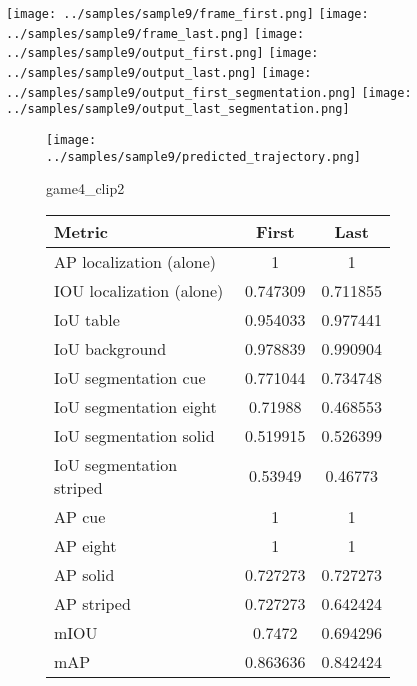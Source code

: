 \begin{figure}
    \texttt{[image: ../samples/sample9/frame\_first.png]}
    \texttt{[image: ../samples/sample9/frame\_last.png]}
    \newline
    \texttt{[image: ../samples/sample9/output\_first.png]}
    \texttt{[image: ../samples/sample9/output\_last.png]}
    \newline
    \texttt{[image: ../samples/sample9/output\_first\_segmentation.png]}
    \texttt{[image: ../samples/sample9/output\_last\_segmentation.png]}
    \newline
    \begin{subfigure}[b]{0.49\textwidth}
        \vspace{20pt}
        \texttt{[image: ../samples/sample9/predicted\_trajectory.png]}
        \caption*{game4\_clip2}
    \end{subfigure}
\begin{subfigure}[b]{0.49\textwidth}
    \begin{tabular}{|l|c|c|}
        \hline
        \textbf{Metric} & \textbf{First} & \textbf{Last} \\
        \hline
        AP localization (alone) & 1 & 1 \\ 
        IOU localization (alone) & 0.747309 & 0.711855 \\ 
        \hline
        IoU table & 0.954033 & 0.977441 \\ 
        IoU background & 0.978839 & 0.990904 \\ 
        \hline
        IoU segmentation cue & 0.771044 & 0.734748 \\ 
        IoU segmentation eight & 0.71988 & 0.468553 \\ 
        IoU segmentation solid & 0.519915 & 0.526399 \\ 
        IoU segmentation striped & 0.53949 & 0.46773 \\ 
        \hline
        AP cue & 1 & 1 \\ 
        AP eight & 1 & 1 \\ 
        AP solid & 0.727273 & 0.727273 \\ 
        AP striped & 0.727273 & 0.642424 \\ 
        \hline
        mIOU & 0.7472 & 0.694296 \\ 
        mAP & 0.863636 & 0.842424 \\ 
        \hline
    \end{tabular}    
\end{subfigure}
\end{figure}